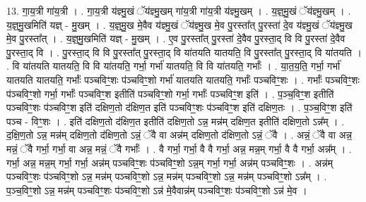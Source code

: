 \documentclass[17pt]{extarticle}
\begin{document}
13. गा॒य॒त्री गा॑य॒त्री । . गा॒य॒त्री य॑ज्ञ्मु॒खं ॅय॑ज्ञ्मु॒खम् गा॑य॒त्री गा॑य॒त्री य॑ज्ञ्मु॒खम् । . य॒ज्ञ्॒मु॒खं ॅय॑ज्ञ्मु॒खम् । . य॒ज्ञ्॒मु॒खमिति॑ यज्ञ् - मु॒खम् । . य॒ज्ञ्॒मु॒ख मे॒वैव य॑ज्ञ्मु॒खं ॅय॑ज्ञ्मु॒ख मे॒व पु॒रस्ता᳚त् पु॒रस्ता॑ दे॒व य॑ज्ञ्मु॒खं ॅय॑ज्ञ्मु॒ख मे॒व पु॒रस्ता᳚त् । . य॒ज्ञ्॒मु॒खमिति॑ यज्ञ् - मु॒खम् । . ए॒व पु॒रस्ता᳚त् पु॒रस्ता॑ दे॒वैव पु॒रस्ता॒द् वि वि पु॒रस्ता॑ दे॒वैव पु॒रस्ता॒द् वि । . पु॒रस्ता॒द् वि वि पु॒रस्ता᳚त् पु॒रस्ता॒द् वि या॑तयति यातयति॒ वि पु॒रस्ता᳚त् पु॒रस्ता॒द् वि या॑तयति । . वि या॑तयति यातयति॒ वि वि या॑तयति॒ गर्भा॒ गर्भा॑ यातयति॒ वि वि या॑तयति॒ गर्भाः᳚ । . या॒त॒य॒ति॒ गर्भा॒ गर्भा॑ यातयति यातयति॒ गर्भाः᳚ पञ्चविꣳ॒॒शः प॑ञ्चविꣳ॒॒शो गर्भा॑ यातयति यातयति॒ गर्भाः᳚ पञ्चविꣳ॒॒शः । . गर्भाः᳚ पञ्चविꣳ॒॒शः प॑ञ्चविꣳ॒॒शो गर्भा॒ गर्भाः᳚ पञ्चविꣳ॒॒श इतीति॑ पञ्चविꣳ॒॒शो गर्भा॒ गर्भाः᳚ पञ्चविꣳ॒॒श इति॑ । . प॒ञ्च॒विꣳ॒॒श इतीति॑ पञ्चविꣳ॒॒शः प॑ञ्चविꣳ॒॒श इति॑ दक्षिण॒तो द॑क्षिण॒त इति॑ पञ्चविꣳ॒॒शः प॑ञ्चविꣳ॒॒श इति॑ दक्षिण॒तः । . प॒ञ्च॒विꣳ॒॒श इति॑ पञ्च - विꣳ॒॒शः । . इति॑ दक्षिण॒तो द॑क्षिण॒त इतीति॑ दक्षिण॒तो ऽन्न॒ मन्न॑म् दक्षिण॒त इतीति॑ दक्षिण॒तो ऽन्न᳚म् । . द॒क्षि॒ण॒तो ऽन्न॒ मन्न॑म् दक्षिण॒तो द॑क्षिण॒तो ऽन्नं॒ ॅवै वा अन्न॑म् दक्षिण॒तो द॑क्षिण॒तो ऽन्नं॒ ॅवै । . अन्नं॒ ॅवै वा अन्न॒ मन्नं॒ ॅवै गर्भा॒ गर्भा॒ वा अन्न॒ मन्नं॒ ॅवै गर्भाः᳚ । . वै गर्भा॒ गर्भा॒ वै वै गर्भा॒ अन्न॒ मन्न॒म् गर्भा॒ वै वै गर्भा॒ अन्न᳚म् । . गर्भा॒ अन्न॒ मन्न॒म् गर्भा॒ गर्भा॒ अन्न॑म् पञ्चविꣳ॒॒शः प॑ञ्चविꣳ॒॒शो ऽन्न॒म् गर्भा॒ गर्भा॒ अन्न॑म् पञ्चविꣳ॒॒शः । . अन्न॑म् पञ्चविꣳ॒॒शः प॑ञ्चविꣳ॒॒शो ऽन्न॒ मन्न॑म् पञ्चविꣳ॒॒शो ऽन्न॒ मन्न॑म् पञ्चविꣳ॒॒शो ऽन्न॒ मन्न॑म् पञ्चविꣳ॒॒शो ऽन्न᳚म् । . प॒ञ्च॒विꣳ॒॒शो ऽन्न॒ मन्न॑म् पञ्चविꣳ॒॒शः प॑ञ्चविꣳ॒॒शो ऽन्न॑ मे॒वैवान्न॑म् पञ्चविꣳ॒॒शः प॑ञ्चविꣳ॒॒शो ऽन्न॑ मे॒व । \newline
\end{document}
